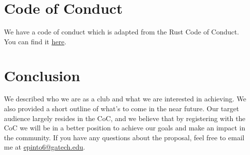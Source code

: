 \documentclass[12pt]{article}
\begin{document}
\section{Code of Conduct} \label{sec:code_of_conduct}

We have a code of conduct which is adapted from the Rust Code of Conduct. You can find it \href{https://dtyped-wiki.netlify.app/about/code-of-conduct/}{here}.

\section{Conclusion}

We described who we are as a club and what we are interested in achieving. We also provided a short outline of what's to come in the near future. Our target audience largely resides in the CoC, and we believe that by registering with the CoC we will be in a better position to achieve our goals and make an impact in the community. If you have any questions about the proposal, feel free to email me at \href{mailto://epinto6@gatech.edu}{epinto6@gatech.edu}. 

\printbibliography[title=Bibliography]
\end{document}
